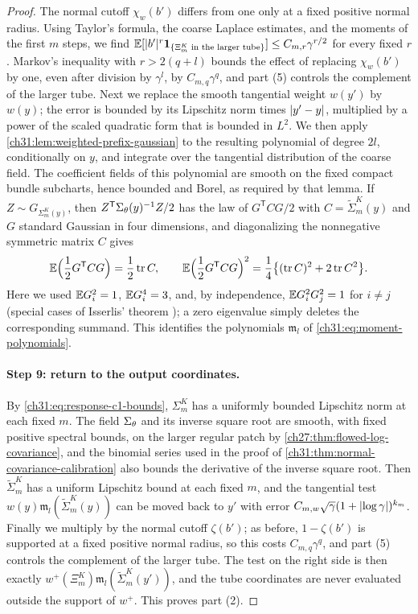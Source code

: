 \begin{proof}
The normal cutoff $\chi_w(b')$ differs from one only at a fixed positive normal radius. Using Taylor's formula, the coarse Laplace estimates, and the moments of the first $m$ steps, we find $\mathbb E[\lvert b'\rvert^r\mathbf 1_{\{\Xi_m^K\text{ in the larger tube}\}}]\le C_{m,r}\gamma^{r/2}$ for every fixed $r$. Markov's inequality with $r>2(q+l)$ bounds the effect of replacing $\chi_w(b')$ by one, even after division by $\gamma^l$, by $C_{m,q}\gamma^q$, and part (5) controls the complement of the larger tube. Next we replace the smooth tangential weight $w(y')$ by $w(y)$; the error is bounded by its Lipschitz norm times $\lvert y'-y\rvert$, multiplied by a power of the scaled quadratic form that is bounded in $L^2$. We then apply \cref{ch31:lem:weighted-prefix-gaussian} to the resulting polynomial of degree $2l$, conditionally on $y$, and integrate over the tangential distribution of the coarse field. The coefficient fields of this polynomial are smooth on the fixed compact bundle subcharts, hence bounded and Borel, as required by that lemma. If $Z\sim G_{\Sigma_m^K(y)}$, then $Z^{\mathsf T}\Sigma_\theta(y)^{-1}Z/2$ has the law of $G^{\mathsf T}CG/2$ with $C=\widetilde\Sigma_m^K(y)$ and $G$ standard Gaussian in four dimensions, and diagonalizing the nonnegative symmetric matrix $C$ gives
\[
 \mathbb E\Bigl(\frac12G^{\mathsf T}CG\Bigr)=\frac12\operatorname{tr} C,\qquad\mathbb E\Bigl(\frac12G^{\mathsf T}CG\Bigr)^2=\frac14\bigl\{(\operatorname{tr} C)^2+2\operatorname{tr} C^2\bigr\}.
\]
Here we used $\mathbb E G_i^2=1$, $\mathbb E G_i^4=3$, and, by independence, $\mathbb E G_i^2G_j^2=1$ for $i\ne j$ (special cases of Isserlis' theorem \cite{Isserlis1918GaussianMoments}); a zero eigenvalue simply deletes the corresponding summand. This identifies the polynomials $\mathfrak m_l$ of \eqref{ch31:eq:moment-polynomials}.

\paragraph{Step 9: return to the output coordinates.}
By \eqref{ch31:eq:response-c1-bounds}, $\Sigma_m^K$ has a uniformly bounded Lipschitz norm at each fixed $m$. The field $\Sigma_\theta$ and its inverse square root are smooth, with fixed positive spectral bounds, on the larger regular patch by \cref{ch27:thm:flowed-log-covariance}, and the binomial series used in the proof of \cref{ch31:thm:normal-covariance-calibration} also bounds the derivative of the inverse square root. Then $\widetilde\Sigma_m^K$ has a uniform Lipschitz bound at each fixed $m$, and the tangential test $w(y)\mathfrak m_l(\widetilde\Sigma_m^K(y))$ can be moved back to $y'$ with error $C_{m,w}\sqrt\gamma(1+\lvert \log\gamma\rvert)^{k_m}$. Finally we multiply by the normal cutoff $\zeta(b')$; as before, $1-\zeta(b')$ is supported at a fixed positive normal radius, so this costs $C_{m,q}\gamma^q$, and part (5) controls the complement of the larger tube. The test on the right side is then exactly $w^+(\Xi_m^K)\mathfrak m_l(\widetilde\Sigma_m^K(y'))$, and the tube coordinates are never evaluated outside the support of $w^+$. This proves part (2).


\end{proof}
